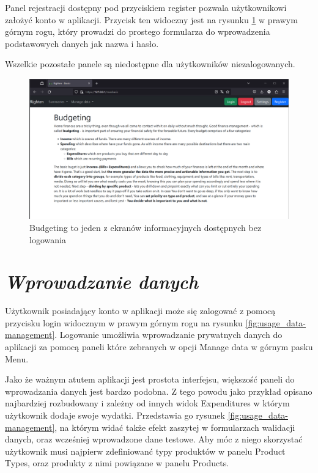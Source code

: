 \documentclass[a4paper, 10pt, twoside, openright]{report}
\newcommand{\customstylesection}[1]{\textbf{\textit{#1}}}
\begin{document}
\begin{large}
{Panel rejestracji dostępny pod przyciskiem register pozwala użytkownikowi 
założyć konto w aplikacji. Przycisk ten widoczny jest na rysunku 
\ref{fig:usage_manual} w prawym górnym rogu, który prowadzi do prostego 
formularza do wprowadzenia podstawowych danych jak nazwa i hasło.}

{Wszelkie pozostałe panele są niedostępne dla użytkowników niezalogowanych.}

\begin{figure}[H]           %
    \centering
    \includegraphics[width=12cm]{figures/Righten_usage_example_manual.png}
    \caption{Budgeting to jeden z ekranów informacyjnych dostępnych bez logowania}
    \label{fig:usage_manual}
\end{figure}

\section{\customstylesection{Wprowadzanie danych}}
{Użytkownik posiadający konto w aplikacji może się zalogować z pomocą przycisku 
login widocznym w prawym górnym rogu na rysunku \ref{fig:usage_data-management}.
 Logowanie umożliwia wprowadzanie prywatnych danych do aplikacji za pomocą 
paneli które zebranych w opcji Manage data w górnym pasku Menu.}

{Jako że ważnym atutem aplikacji jest prostota interfejsu, większość paneli do 
wprowadzania danych jest bardzo podobna. Z tego powodu jako przykład opisano 
najbardziej rozbudowany i zależny od innych widok Expenditures w którym 
użytkownik dodaje swoje wydatki. Przedstawia go rysunek 
\ref{fig:usage_data-management}, na którym widać także efekt zaszytej w 
formularzach walidacji danych, oraz wcześniej wprowadzone dane testowe. Aby móc 
z niego skorzystać użytkownik musi najpierw zdefiniowanć typy produktów w panelu
 Product Types, oraz produkty z nimi powiązane w panelu Products.}


\end{large}
\end{document}

